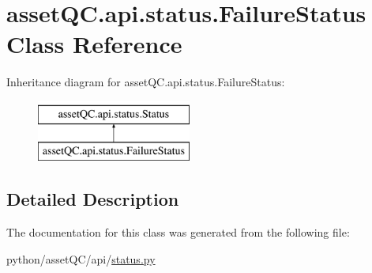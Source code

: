 \hypertarget{classassetQC_1_1api_1_1status_1_1FailureStatus}{\section{asset\-Q\-C.\-api.\-status.\-Failure\-Status \-Class \-Reference}
\label{d6/dcb/classassetQC_1_1api_1_1status_1_1FailureStatus}
}
\-Inheritance diagram for asset\-Q\-C.\-api.\-status.\-Failure\-Status\-:\begin{figure}[H]
\begin{center}
\leavevmode
\includegraphics[height=2.000000cm]{d6/dcb/classassetQC_1_1api_1_1status_1_1FailureStatus}
\end{center}
\end{figure}


\subsection{\-Detailed \-Description}
\begin{DoxyVerb}

\end{DoxyVerb}
 

\-The documentation for this class was generated from the following file\-:\begin{DoxyCompactItemize}
\item 
python/asset\-Q\-C/api/\hyperlink{status_8py}{status.\-py}\end{DoxyCompactItemize}
